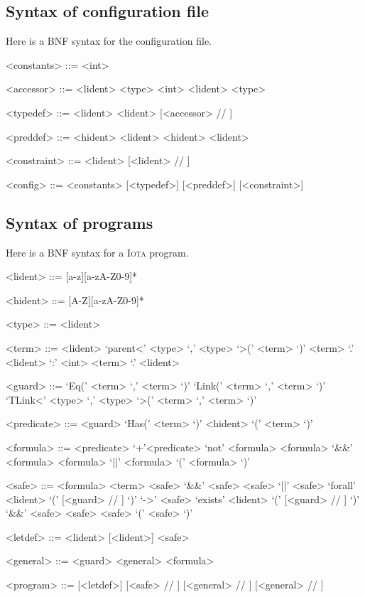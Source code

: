\documentclass[10pt,a4paper]{article}
\newcommand\Iota{\textsc{Iota}}
\begin{document}
\subsection{Syntax of configuration file}
\label{subsec:syntaxconfig} Here is a BNF syntax for the configuration file.
\begin{grammar}
  <constants> ::=
    \lit{=} <int>

  <accessor> ::=
  <lident>  <type>
  \alt <int> <lident>  <type>

  <typedef> ::=
   <lident>
  \alt {} <lident> \lit{=} [<accessor> // \lit{|}]

  <preddef> ::=
   <hident>  <lident>
  \alt {} <hident>  <lident>

  <constraint> ::=
   <lident>  [<lident> // \lit{|}]

  <config> ::=
  <constants> [<typedef>] [<preddef>] [<constraint>]
\end{grammar}

\subsection{Syntax of programs}
\label{subsec:syntaxprog} Here is a BNF syntax for a \Iota{} program.
\begin{grammar}
  <lident> ::= [a-z][a-zA-Z0-9]*

  <hident> ::= [A-Z][a-zA-Z0-9]*

  <type> ::= <lident>

  <term> ::= <lident>
  \alt `parent<' <type> `,' <type> `>(' <term> `)'
  \alt <term> `.' <lident> `:' <int>
  \alt <term> `.' <lident>

  <guard> ::= `Eq(' <term> `,' <term> `)'
  \alt `Link(' <term> `,' <term> `)'
  \alt `TLink<' <type> `,' <type> `>(' <term> `,' <term> `)'

  <predicate> ::= <guard>
  \alt `Has(' <term> `)'
  \alt <hident> `(' <term> `)'

  <formula> ::= <predicate>
  \alt `+'<predicate>
  \alt `not' <formula>
  \alt <formula> `&&' <formula>
  \alt <formula> `||' <formula>
  \alt `(' <formula> `)'

  <safe> ::= <formula>
  \alt <term>
  \alt <safe> `&&' <safe>
  \alt <safe> `||' <safe>
  \alt `forall' <lident> `(' [<guard> // \lit{||}] `)' `->' <safe>
  \alt `exists' <lident> `(' [<guard> // \lit{||}] `)' `&&' <safe>
  \alt <safe> <safe>
  \alt `(' <safe> `)'

  <letdef> ::=  <lident> [<lident>] \lit{=} <safe>

  <general> ::=
  <guard> \lit{->} <general>
  \alt \lit{=>} <formula>

  <program> ::=
  [<letdef>]  [<safe> // \lit{;}]  [<general> // \lit{;}]  [<general> // \lit{;}]

\end{grammar}



\end{document}
